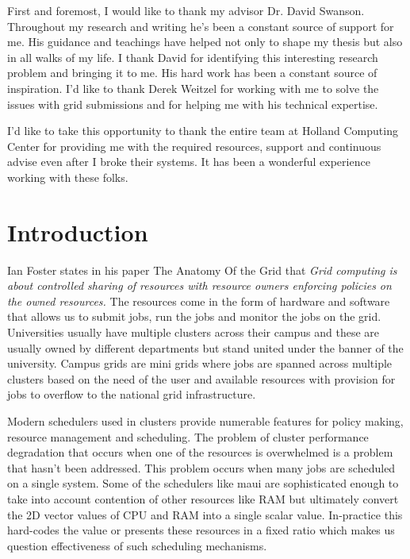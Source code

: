 \documentclass[ms,electronic,double]{nuthesis}
\begin{document}

\begin{acknowledgments}

First and foremost, I would like to thank my advisor Dr. David Swanson. Throughout my research
and writing he's been a constant source of support for me. His guidance and teachings have helped not 
only to shape my thesis but also in all walks of my life. I thank David for identifying this interesting
research problem and bringing it to me. His hard work has been a constant source of inspiration.
 I'd like to thank Derek Weitzel for working with me to solve the 
 issues with grid submissions and for helping me with his technical expertise.
 
 I'd like to take this opportunity to thank the entire team at Holland 
Computing Center for providing me with the required resources, support and continuous advise
 even after I broke their systems. It has been a wonderful experience 
 working with these folks.
 
\end{acknowledgments}

\tableofcontents
\newpage
\listoffigures


\mainmatter

\chapter{Introduction}
Ian Foster states in his paper The Anatomy Of the Grid \cite{Foster:2001:AGE:1080644.1080667} that 
\emph{Grid computing is about controlled sharing of resources with resource owners enforcing policies 
on the owned resources.} The resources come in the form of hardware 
and software that allows us to submit jobs, run the jobs and monitor the jobs on the grid. 
Universities usually have multiple clusters across their campus and these are 
usually owned by different departments but stand united under the banner of the university.
Campus grids are mini grids where jobs are spanned across multiple clusters
 based on the need of the user and available resources with provision for jobs to overflow to the national
grid infrastructure\cite{derekThesis}.

Modern schedulers used in clusters provide numerable features for policy making, resource management 
and scheduling. The problem of cluster 
performance degradation that occurs when one of the resources is overwhelmed is a problem that hasn't been 
addressed. This problem occurs when many jobs are scheduled on a single system. Some of 
the schedulers like maui \cite{pbstorque} are sophisticated enough to take into account contention of other 
resources like RAM but ultimately convert the 2D vector values of CPU and RAM 
into a single scalar value. In-practice this hard-codes the value or presents these resources
in a fixed ratio which makes us question effectiveness of such scheduling mechanisms. 
\end{document}
